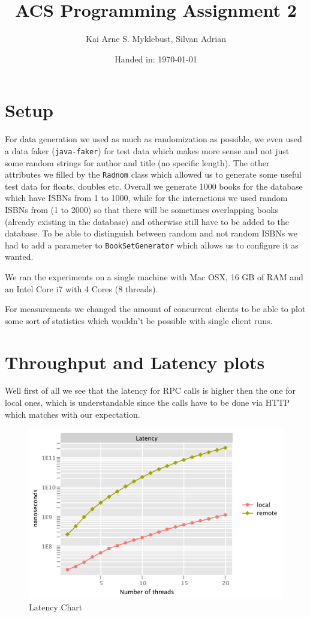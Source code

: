 \documentclass[12pt,a4paper]{article}
\begin{document}
\title{ACS Programming Assignment 2}
\subtitle{}

\author{Kai Arne S. Myklebust, Silvan Adrian}
\date{Handed in: \today}
	
\maketitle
\tableofcontents

\section{Setup}
For data generation we used as much as randomization as possible, we even used a data faker (\texttt{java-faker}) for test data which makes more sense and not just some random strings for author and title (no specific length).
The other attributes we filled by the \texttt{Radnom} class which allowed us to generate some useful test data for floats, doubles etc.
Overall we generate 1000 books for the database which have ISBNs from 1 to 1000, while for the interactions we used random ISBNs from (1 to 2000) so that there will be sometimes overlapping books (already existing in the database) and otherwise still have to be added to the database.
To be able to distinguish between random and not random ISBNs we had to add a parameter to \texttt{BookSetGenerator} which allows us to configure it as wanted.

We ran the experiments on a single machine with Mac OSX, 16 GB of RAM and an Intel Core i7 with 4 Cores (8 threads).

For measurements we changed the amount of concurrent clients to be able to plot some sort of statistics which wouldn't be possible with single client runs.

\section{Throughput and Latency plots}

Well first of all we see that the latency for RPC calls is higher then the one for local ones, which is understandable since the calls have to be done via HTTP which matches with our expectation.
\begin{figure}[htb!]
	\includegraphics[width=\textwidth]{latency_chart}
	\caption{Latency Chart}
\end{figure}
\end{document}
